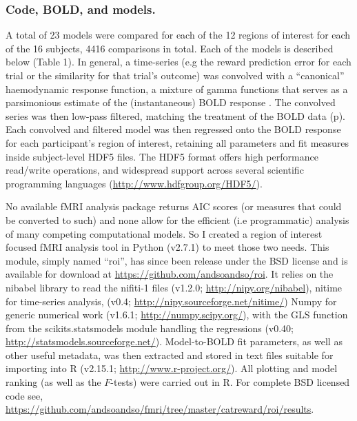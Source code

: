 \subsubsection{Code, BOLD, and models.}
\label{sub:cmb}
A total of 23 models were compared for each of the 12 regions of interest for each of the 16 subjects, 4416 comparisons in total.  Each of the models is described below (Table 1).  In general, a time-series (e.g the reward prediction error for each trial or the similarity for that trial's outcome) was convolved with a ``canonical''  haemodynamic response function, a mixture of gamma functions that serves as a parsimonious estimate of the (instantaneous) BOLD response \cite{Friston:1998p2022}.  The convolved series was then low-pass filtered, matching the treatment of the BOLD data (p\pageref{subsub:preprocessed}).  Each convolved and filtered model was then regressed onto the BOLD response for each participant's region of interest, retaining all parameters and fit measures inside subject-level HDF5 files.  The HDF5 format offers high performance read/write operations, and widespread support across several scientific programming languages (\url{http://www.hdfgroup.org/HDF5/}).

No available fMRI analysis package returns AIC scores (or measures that could be converted to such) and none allow for the efficient (i.e programmatic) analysis of many competing computational models. So I created a region of interest focused fMRI analysis tool in Python (v2.7.1) to meet those two needs.  This module, simply named ``roi'', has since been release under the BSD license and is available for download at \url{https://github.com/andsoandso/roi}. It relies on the nibabel library to read the nifiti-1 files  (v1.2.0; \url{http://nipy.org/nibabel}), nitime for time-series analysis, (v0.4; \url{http://nipy.sourceforge.net/nitime/}) Numpy for generic numerical work (v1.6.1; \url{http://numpy.scipy.org/}), with the GLS function from the scikits.statsmodels module handling the regressions (v0.40; \url{http://statsmodels.sourceforge.net/}).  Model-to-BOLD fit parameters, as well as other useful metadata, was then extracted and stored in text files suitable for importing into R (v2.15.1; \url{http://www.r-project.org/}).  All plotting and model ranking (as well as the $F$-tests) were carried out in R.  For complete BSD licensed code see, \url{https://github.com/andsoandso/fmri/tree/master/catreward/roi/results}.

